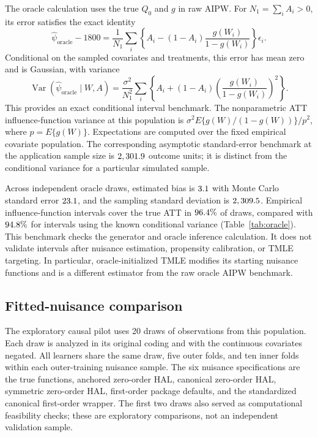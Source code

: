 \documentclass[11pt]{article}
\theoremstyle{definition}
\theoremstyle{remark}
\begin{document}
The oracle calculation uses the true $Q_0$ and $g$ in raw AIPW. For
$N_1=\sum_i A_i>0$, its error satisfies the exact identity
\begin{equation}\label{eq:oracle-noise}
 \hat\psi_{\mathrm{oracle}}-1800
 =\frac{1}{N_1}\sum_i
 \left\{A_i-(1-A_i)\frac{g(W_i)}{1-g(W_i)}\right\}\epsilon_i.
\end{equation}
Conditional on the sampled covariates and treatments, this error has mean
zero and is Gaussian, with variance
\[
 \operatorname{Var}(\hat\psi_{\mathrm{oracle}}\mid W,A)
 =\frac{\sigma^2}{N_1^2}
   \sum_i\left\{A_i+(1-A_i)
       \left(\frac{g(W_i)}{1-g(W_i)}\right)^2\right\}.
\]
This provides an exact conditional interval benchmark. The nonparametric
ATT influence-function variance at this population is
$\sigma^2 E\{g(W)/(1-g(W))\}/p^2$, where $p=E\{g(W)\}$. Expectations are
computed over the fixed empirical covariate population. The corresponding
asymptotic standard-error benchmark at the application sample size is
$2,301.9$ outcome units; it is distinct from the conditional
variance for a particular simulated sample.

Across \OracleReplicates{} independent oracle draws, estimated bias is
$3.1$ with Monte Carlo standard error $23.1$, and the
sampling standard deviation is $2,309.5$. Empirical influence-function
intervals cover the true ATT in $96.4\%$ of draws, compared with
$94.8\%$ for intervals using the known conditional
variance (Table~\ref{tab:oracle}). This benchmark checks the generator and
oracle inference calculation. It does not validate intervals after nuisance
estimation, propensity calibration, or TMLE targeting. In particular,
oracle-initialized TMLE modifies its starting nuisance functions and is a
different estimator from the raw oracle AIPW benchmark.



\subsection{Fitted-nuisance comparison}

The exploratory causal pilot uses 20 draws of \CausalN{} observations
from this population. Each draw is analyzed in its original coding and
with the continuous covariates negated. All learners share the same draw,
five outer folds, and ten inner folds within each outer-training nuisance
sample. The six nuisance specifications are the true functions, anchored
zero-order HAL, canonical zero-order HAL, symmetric zero-order HAL,
first-order package defaults, and the standardized canonical first-order
wrapper. The first two draws also served as computational feasibility
checks; these are exploratory comparisons, not an independent validation
sample.
\end{document}
